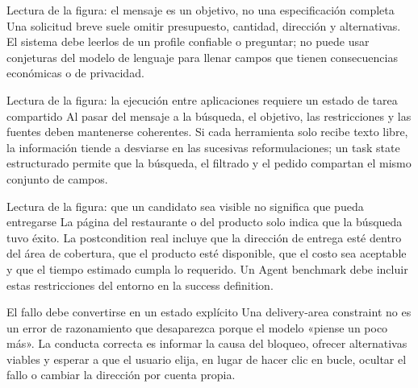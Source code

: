 
\begin{knowledgebox}{Lectura de la figura: el mensaje es un objetivo, no una especificación completa}
Una solicitud breve suele omitir presupuesto, cantidad, dirección y alternativas. El sistema debe leerlos de un profile confiable o preguntar; no puede usar conjeturas del modelo de lenguaje para llenar campos que tienen consecuencias económicas o de privacidad.
\end{knowledgebox}


\begin{knowledgebox}{Lectura de la figura: la ejecución entre aplicaciones requiere un estado de tarea compartido}
Al pasar del mensaje a la búsqueda, el objetivo, las restricciones y las fuentes deben mantenerse coherentes. Si cada herramienta solo recibe texto libre, la información tiende a desviarse en las sucesivas reformulaciones; un task state estructurado permite que la búsqueda, el filtrado y el pedido compartan el mismo conjunto de campos.
\end{knowledgebox}


\begin{knowledgebox}{Lectura de la figura: que un candidato sea visible no significa que pueda entregarse}
La página del restaurante o del producto solo indica que la búsqueda tuvo éxito. La postcondition real incluye que la dirección de entrega esté dentro del área de cobertura, que el producto esté disponible, que el costo sea aceptable y que el tiempo estimado cumpla lo requerido. Un Agent benchmark debe incluir estas restricciones del entorno en la success definition.
\end{knowledgebox}


\begin{warningbox}{El fallo debe convertirse en un estado explícito}
Una delivery-area constraint no es un error de razonamiento que desaparezca porque el modelo «piense un poco más». La conducta correcta es informar la causa del bloqueo, ofrecer alternativas viables y esperar a que el usuario elija, en lugar de hacer clic en bucle, ocultar el fallo o cambiar la dirección por cuenta propia.
\end{warningbox}

